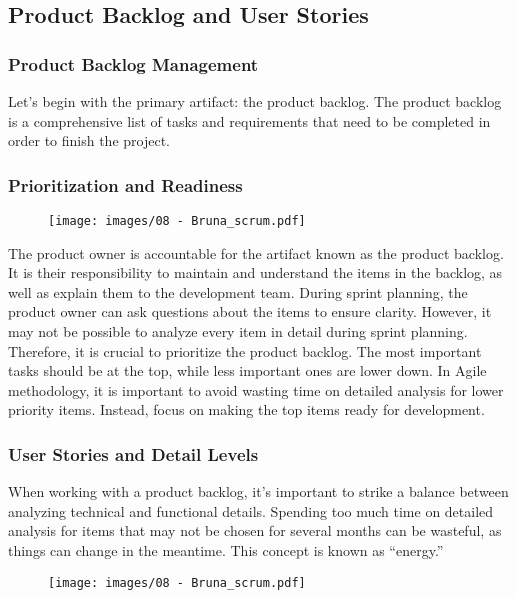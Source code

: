 \subsection{Product Backlog and User Stories}

\subsubsection{Product Backlog Management}

Let's begin with the primary artifact: the product backlog. The product
backlog is a comprehensive list of tasks and requirements that need to
be completed in order to finish the project.

\subsubsection{Prioritization and Readiness}

\begin{figure}[!h]
    \centering
    \texttt{[image: images/08 - Bruna\_scrum.pdf]}
\end{figure}

The product owner is accountable for the artifact known as the product
backlog. It is their responsibility to maintain and understand the items
in the backlog, as well as explain them to the development team. During
sprint planning, the product owner can ask questions about the items to
ensure clarity. However, it may not be possible to analyze every item in
detail during sprint planning. Therefore, it is crucial to prioritize
the product backlog. The most important tasks should be at the top,
while less important ones are lower down. In Agile methodology, it is
important to avoid wasting time on detailed analysis for lower priority
items. Instead, focus on making the top items ready for development.

\subsubsection{User Stories and Detail Levels}

When working with a product backlog, it's important to strike a balance
between analyzing technical and functional details. Spending too much
time on detailed analysis for items that may not be chosen for several
months can be wasteful, as things can change in the meantime. This
concept is known as ``energy.''

\begin{figure}[!h]
    \centering
    \texttt{[image: images/08 - Bruna\_scrum.pdf]}
\end{figure}

